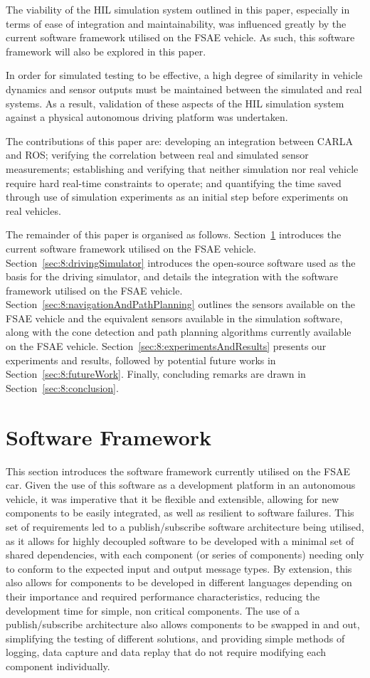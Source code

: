 The viability of the HIL simulation system outlined in this paper, especially in terms of ease of integration and maintainability, was influenced greatly by the current software framework utilised on the FSAE vehicle.
As such, this software framework will also be explored in this paper.

In order for simulated testing to be effective, a high degree of similarity in vehicle dynamics and sensor outputs must be maintained between the simulated and real systems.
As a result, validation of these aspects of the HIL simulation system against a physical autonomous driving platform was undertaken.

The contributions of this paper are: developing an integration between CARLA and ROS; verifying the correlation between real and simulated sensor measurements; establishing and verifying that neither simulation nor real vehicle require hard real-time constraints to operate; and quantifying the time saved through use of simulation experiments as an initial step before experiments on real vehicles.

The remainder of this paper is organised as follows.
Section~\ref{sec:8:softwareFramework} introduces the current software framework utilised on the FSAE vehicle.
Section~\ref{sec:8:drivingSimulator} introduces the open-source software used as the basis for the driving simulator, and details the integration with the software framework utilised on the FSAE vehicle.
Section~\ref{sec:8:navigationAndPathPlanning} outlines the sensors available on the FSAE vehicle and the equivalent sensors available in the simulation software, along with the cone detection and path planning algorithms currently available on the FSAE vehicle.
Section~\ref{sec:8:experimentsAndResults} presents our experiments and results, followed by potential future works in Section~\ref{sec:8:futureWork}.
Finally, concluding remarks are drawn in Section~\ref{sec:8:conclusion}.

\section{Software Framework} \label{sec:8:softwareFramework}
This section introduces the software framework currently utilised on the FSAE car.
Given the use of this software as a development platform in an autonomous vehicle, it was imperative that it be flexible and extensible, allowing for new components to be easily integrated, as well as resilient to software failures.
This set of requirements led to a publish/subscribe software architecture being utilised, as it allows for highly decoupled software to be developed with a minimal set of shared dependencies, with each component (or series of components) needing only to conform to the expected input and output message types.
By extension, this also allows for components to be developed in different languages depending on their importance and required performance characteristics, reducing the development time for simple, non critical components.
The use of a publish/subscribe architecture also allows components to be swapped in and out, simplifying the testing of different solutions, and providing simple methods of logging, data capture and data replay that do not require modifying each component individually.

